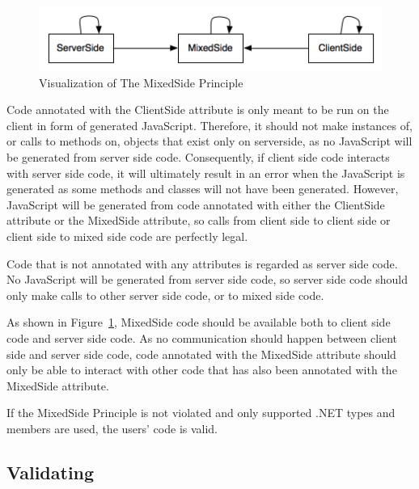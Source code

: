		\begin{figure}[H]
			\begin{center}
				\centerline{\includegraphics[width=12cm]{resources/images/MixedSidePrinciple.png}}
			\end{center}
			\caption{Visualization of The MixedSide Principle}
			\label{fig:MixedSidePrinciple}
		\end{figure}

		Code annotated with the ClientSide attribute is only meant to be run on the client in form of generated JavaScript. Therefore, it should not make instances of, or calls to methods on, objects that exist only on serverside, as no JavaScript will be generated from server side code. Consequently, if client side code interacts with server side code, it will ultimately result in an error when the JavaScript is generated as some methods and classes will not have been generated. However, JavaScript will be generated from code annotated with either the ClientSide attribute or the MixedSide attribute, so calls from client side to client side or client side to mixed side code are perfectly legal.

		Code that is not annotated with any attributes is regarded as server side code. No JavaScript will be generated from server side code, so server side code should only make calls to other server side code, or to mixed side code.

		As shown in Figure~\ref{fig:MixedSidePrinciple}, MixedSide code should be available both to client side code and server side code. As no communication should happen between client side and server side code, code annotated with the MixedSide attribute should only be able to interact with other code that has also been annotated with the MixedSide attribute. 

		If the MixedSide Principle is not violated and only supported .NET types and members are used, the users’ code is valid.


	\subsection{Validating} %
	\label{sub:validating}

